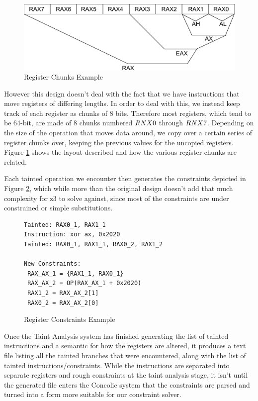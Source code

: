 \begin{figure}[ht]
 \centering
 \includegraphics{taintregs}
 \caption{Register Chunks Example}
 \label{figure:taintregs}
\end{figure}

However this design doesn't deal with the fact that we have instructions that
move registers of differing lengths. In order to deal with this, we instead keep
track of each register as chunks of 8 bits. Therefore most registers, which tend
to be 64-bit, are made of 8 chunks numbered $R{\it N}X0$ through $R{\it  N}X7$.  
Depending on the size of the operation that moves data around, we copy
over a certain series of register chunks over, keeping the previous values for
the uncopied registers. Figure \ref{figure:taintregs} shows the layout described
and how the various register chunks are related.

Each tainted operation we encounter then generates the constraints depicted in
Figure \ref{figure:regexample}, which while more than the original design
doesn't add that much complexity for z3 to solve against, since most of the
constraints are under constrained or simple substitutions.

\begin{figure}[t]
\centering
\begin{verbatim}
Tainted: RAX0_1, RAX1_1
Instruction: xor ax, 0x2020
Tainted: RAX0_1, RAX1_1, RAX0_2, RAX1_2

New Constraints:
 RAX_AX_1 = {RAX1_1, RAX0_1}
 RAX_AX_2 = OP(RAX_AX_1 + 0x2020)
 RAX1_2 = RAX_AX_2[1]
 RAX0_2 = RAX_AX_2[0]
\end{verbatim}
\caption{Register Constraints Example}
\label{figure:regexample}
\end{figure}

Once the Taint Analysis system has finished generating the list of tainted
instructions and a semantic for how the registers are altered, it produces a
text file listing all the tainted branches that were encountered, along with the
list of tainted instructions/constraints. While the instructions are separated
into separate registers and rough constraints at the taint analysis stage, it
isn't until the generated file enters the Concolic system that the constraints
are parsed and turned into a form more suitable for our constraint solver.

